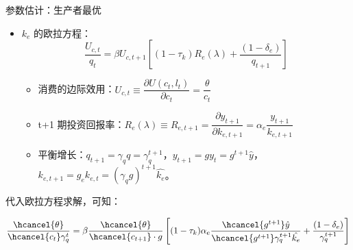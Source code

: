 \documentclass[aspectratio=169,10pt]{beamer}
\begin{document}
\begin{frame}{参数估计：生产者最优}
  \begin{itemize}
    \item $k_e$ 的欧拉方程：
          \begin{equation*}
            \dfrac{U_{c,t}}{q_t} = \beta U_{c,t+1} \left[(1-\tau_k) R_e(\lambda) + \dfrac{(1-\delta_e)}{q_{t+1}} \right]
          \end{equation*}
          \begin{itemize}
            \item 消费的边际效用：$U_{c,t} \equiv \dfrac{\partial U(c_t, l_t)}{\partial c_t} = \dfrac{\theta}{c_t}$
            \item t+1 期投资回报率：$R_e(\lambda) \equiv R_{e,t+1} = \dfrac{\partial y_{t+1}}{\partial k_{e,t+1}} = \alpha_e \dfrac{y_{t+1}}{k_{e,t+1}}$
            \item 平衡增长：$q_{t+1} = \gamma_q q = \gamma_q^{t+1}$，$y_{t+1} = g y_t = g^{t+1} \hat{y}$，$k_{e,t+1} = g_e k_{e,t} = (\gamma_q g)^{t+1} \hat{k_e}$。
          \end{itemize}
  \end{itemize}

  \listaftertext
  代入欧拉方程求解，可知：

  \begin{equation*}
    \dfrac{\hcancel{\theta} }{\hcancel{c_{t}} \gamma_q^t } = \beta \dfrac{\hcancel{\theta}}{\hcancel{c_{t+1}} \cdot g } \left[(1-\tau_k) \alpha_e \dfrac{\hcancel{g^{t+1}} \hat{y}}{\hcancel{g^{t+1}} \gamma_q^{t+1} \hat{k_e}} + \dfrac{(1-\delta_e)}{\gamma_q^{t+1} } \right]
  \end{equation*}
\end{frame}
\end{document}
